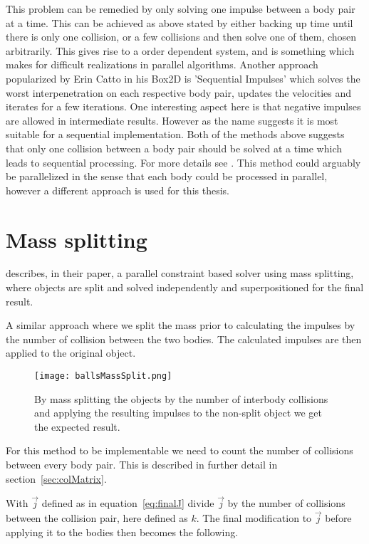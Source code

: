 This problem can be remedied by only solving one impulse between a body pair at a time.
This can be achieved as above stated by either backing up time until there
is only one collision, or a few collisions and then solve one of them, chosen
arbitrarily. This gives rise to a order dependent system, and is something which
makes for difficult realizations in parallel algorithms. Another approach popularized
by Erin Catto in his Box2D is 'Sequential Impulses' which solves the worst interpenetration
on each respective body pair, updates the velocities and iterates for a few iterations.
One interesting aspect here is that negative impulses are allowed in intermediate
results. However as the name suggests it is most suitable for a sequential implementation.
Both of the methods above suggests that only one collision between a body pair should
be solved at a time which leads to sequential processing. For more details see \cite{catto}.
This method could arguably be parallelized in the sense that each body could be
processed in parallel, however a different approach is used for this thesis.

\section{Mass splitting}\label{sec:massSplit}
\cite{tonge} describes, in their paper, a parallel constraint based solver
using mass splitting, where objects are split and solved independently and superpositioned
for the final result.

A similar approach where we split the mass prior to
calculating the impulses by the number of collision between the two bodies. The
calculated impulses are then applied to the original object.

\begin{figure}[H]
  \centering
  \texttt{[image: ballsMassSplit.png]}
  \caption{By mass splitting the objects by the number of interbody collisions
  and applying the resulting impulses to the non-split object we get the expected result.}
  \label{fig:massSplit}
\end{figure}

For this method to be implementable we need to count the number of collisions between
every body pair. This is described in further detail in section~\ref{sec:colMatrix}.

With $\vec{j}$ defined as in equation~\ref{eq:finalJ} divide $\vec{j}$ by
the number of collisions between the collision pair, here defined as $k$. The final modification to
$\vec{j}$ before applying it to the bodies then becomes the following.


